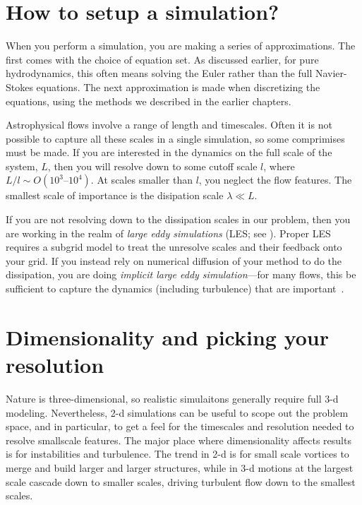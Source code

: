 \section{How to setup a simulation?}

When you perform a simulation, you are making a series of
approximations.  The first comes with the choice of equation set.  As
discussed earlier, for pure hydrodynamics, this often means solving
the Euler rather than the full Navier-Stokes equations.  The next
approximation is made when discretizing the equations, using the 
methods we described in the earlier chapters.  

Astrophysical flows involve a range of length and timescales.  Often
it is not possible to capture all these scales in a single simulation,
so some comprimises must be made.  If you are interested in the
dynamics on the full scale of the system, $L$, then you will resolve
down to some cutoff scale $l$, where $L/l \sim O(10^3\mbox{--}10^4)$.
At scales smaller than $l$, you neglect the flow features.  The
smallest scale of importance is the disipation scale $\lambda \ll L$.

If you are not resolving down to the dissipation scales in our
problem, then you are working in the realm of {\em large eddy
  simulations} (LES; see \cite{schmidt:2014}).  Proper LES requires a
subgrid model to treat the unresolve scales and their feedback onto
your grid.  If you instead rely on numerical diffusion of your method
to do the dissipation, you are doing {\em implicit large eddy
  simulation}---for many flows, this be sufficient to capture the
dynamics (including turbulence) that are important~\cite{aspden:2008}.

\section{Dimensionality and picking your resolution}

Nature is three-dimensional, so realistic simulaitons generally
require full 3-d modeling.  Nevertheless, 2-d simulations can be
useful to scope out the problem space, and in particular, to get a
feel for the timescales and resolution needed to resolve smallscale
features.  The major place where dimensionality affects results is for
instabilities and turbulence.  The trend in 2-d is for small scale
vortices to merge and build larger and larger structures, while in 3-d
motions at the largest scale cascade down to smaller scales, driving
turbulent flow down to the smallest scales.

